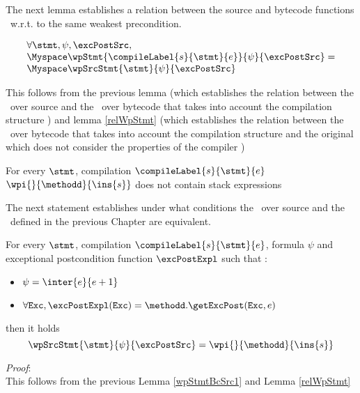 The next lemma establishes  a relation between the source and bytecode functions \wpName \ w.r.t. to the same weakest precondition. 


\begin{wpStmtBcSrc1} \label{wpStmtBcSrc1}
 
$$ 
    \begin{array}{l}
    \forall \stmt, \psi, \excPostSrc , \\
       \Myspace  \wpStmt{\compileLabel{s}{\stmt}{e}}{ \psi }{ \excPostSrc }  = \\
       \Myspace   \wpSrcStmt{\stmt  }{\psi }{ \excPostSrc }  
	 
    \end{array}
 $$
\end{wpStmtBcSrc1}

This follows from the previous lemma (which establishes the relation between the \wpName \ over source and
 the \wpName \ over bytecode that takes into account the compilation structure  )
and lemma \ref{relWpStmt} (which establishes the relation between the \wpName \ over bytecode that takes into account the compilation structure  and the original \wpName which does 
not consider the properties of the compiler )

 


 
\begin{wpStmtBcSrc3}  \label{wpStmtBcSrc3}
For every $\stmt$, compilation $\compileLabel{s}{\stmt}{e}$ 
$ \wpi{}{\methodd}{\ins{s} } $ does not contain stack expressions
\end{wpStmtBcSrc3}

The next statement establishes under what conditions
 the \wpName \  over source and the \wpName \ defined in the previous Chapter are equivalent.

\begin{wpStmtBcSrc2} \label{wpStmtBcSrc2}
For every $\stmt$, compilation $\compileLabel{s}{\stmt}{e}$,  formula $\psi$ and 
   exceptional postcondition  function $\excPostExpl $ such that :
 
  \begin{itemize}
         \item $\psi = \inter{e}{e+1}$
	 \item$\forall \mbox{\rm\texttt{Exc}} ,  \excPostExpl( \mbox{\rm\texttt{Exc}} ) = \methodd.\getExcPost(\mbox{\rm\texttt{Exc}}, e) $ 
  \end{itemize}
      then it holds 
$$ \wpSrcStmt{\stmt}{\psi }{\excPostSrc }  = \wpi{}{\methodd}{\ins{s} }$$
\end{wpStmtBcSrc2}
\textit{Proof}: \\
This follows from the previous Lemma \ref{wpStmtBcSrc1} and Lemma \ref{relWpStmt} \\
\Qed


